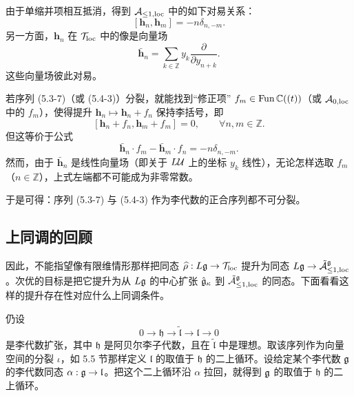 由于单缩并项相互抵消，得到 $\mathcal{A}_{\le1,\mathrm{loc}}$ 中的如下对易关系：
\[
[\mathbf{h}_n,\mathbf{h}_m] = -n\delta_{n,-m}.
\]
另一方面，$\mathbf{h}_n$ 在 $\mathcal{T}_{\mathrm{loc}}$ 中的像是向量场
\[
\bar{\mathbf{h}}_n = \sum_{k\in\mathbb{Z}}y_k\frac{\partial}{\partial y_{n+k}}.
\]
这些向量场彼此对易。

若序列 (5.3-7)（或 (5.4-3)）分裂，就能找到“修正项” $f_m\in\operatorname{Fun}\mathbb{C}((t))$（或 $\mathcal{A}_{0,\mathrm{loc}}$ 中的 $f_m$），使得提升 $\mathbf{h}_n\mapsto\mathbf{h}_n+f_n$ 保持李括号，即
\[
[\mathbf{h}_n+f_n,\mathbf{h}_m+f_m] = 0,\qquad \forall n,m\in\mathbb{Z}.
\]
但这等价于公式
\[
\bar{\mathbf{h}}_n\cdot f_m - \bar{\mathbf{h}}_m\cdot f_n = -n\delta_{n,-m}.
\]
然而，由于 $\bar{\mathbf{h}}_n$ 是线性向量场（即关于 $L\mathcal{U}$ 上的坐标 $y_k$ 线性），无论怎样选取 $f_m$（$n\in\mathbb{Z}$），上式左端都不可能成为非零常数。

于是可得：序列 (5.3-7) 与 (5.4-3) 作为李代数的正合序列都不可分裂。

\subsection{上同调的回顾}

因此，不能指望像有限维情形那样把同态 $\widehat{\rho}: L\mathfrak{g}\to\mathcal{T}_{\mathrm{loc}}$ 提升为同态 $L\mathfrak{g}\to\tilde{\mathcal{A}}^{\mathfrak{g}}_{\le1,\mathrm{loc}}$。次优的目标是把它提升为从 $L\mathfrak{g}$ 的中心扩张 $\hat{\mathfrak{g}}_\kappa$ 到 $\tilde{\mathcal{A}}^{\mathfrak{g}}_{\le1,\mathrm{loc}}$ 的同态。下面看看这样的提升存在性对应什么上同调条件。

仍设
\[
0\to\mathfrak{h}\to\tilde{\mathfrak{l}}\to\mathfrak{l}\to 0
\]
是李代数扩张，其中 $\mathfrak{h}$ 是阿贝尔李子代数，且在 $\tilde{\mathfrak{l}}$ 中是理想。取该序列作为向量空间的分裂 $\iota$，如 5.5 节那样定义 $\mathfrak{l}$ 的取值于 $\mathfrak{h}$ 的二上循环。设给定某个李代数 $\mathfrak{g}$ 的李代数同态 $\alpha:\mathfrak{g}\to\mathfrak{l}$。把这个二上循环沿 $\alpha$ 拉回，就得到 $\mathfrak{g}$ 的取值于 $\mathfrak{h}$ 的二上循环。

